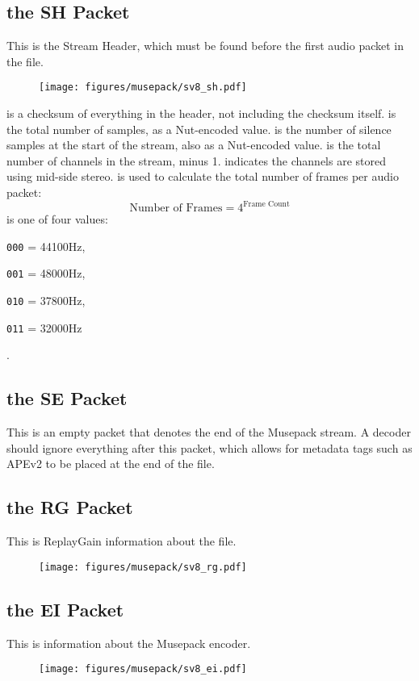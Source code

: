 \subsection{the SH Packet}
This is the Stream Header, which must be found before the first
audio packet in the file.
\begin{figure}[h]
\texttt{[image: figures/musepack/sv8\_sh.pdf]}
\end{figure}
\par
\noindent
{} is a checksum of everything in the header, not including the
checksum itself.
 is the total number of samples, as a Nut-encoded value.
 is the number of silence samples at the start
of the stream, also as a Nut-encoded value.
 is the total number of channels in the stream, minus 1.
 indicates the channels are stored using mid-side stereo.
 is used to calculate the total number of frames per
audio packet:
\begin{equation}
\text{Number of Frames} = 4 ^ \text{Frame Count}
\end{equation}
 is one of four values:

\begin{inparaenum}
\item[\texttt{000} = ] 44100Hz,
\item[\texttt{001} = ] 48000Hz,
\item[\texttt{010} = ] 37800Hz,
\item[\texttt{011} = ] 32000Hz
\end{inparaenum}
.

\subsection{the SE Packet}
This is an empty packet that denotes the end of the Musepack stream.
A decoder should ignore everything after this packet, which allows
for metadata tags such as APEv2 to be placed at the end of the file.

\subsection{the RG Packet}
This is ReplayGain information about the file.
\begin{figure}[h]
\texttt{[image: figures/musepack/sv8\_rg.pdf]}
\end{figure}

\subsection{the EI Packet}
This is information about the Musepack encoder.
\begin{figure}[h]
\texttt{[image: figures/musepack/sv8\_ei.pdf]}
\end{figure}
